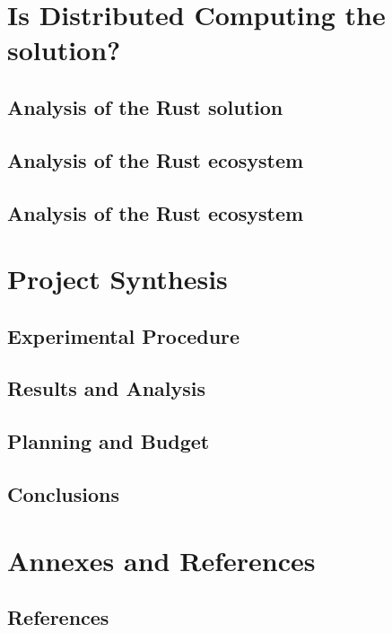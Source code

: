 \documentclass{legrand}
\begin{document}
\part{Is Distributed Computing the solution?}

\chapter{Analysis of the Rust solution}
\label{chapter:analysis}


\chapter{Analysis of the Rust ecosystem}
\label{chapter:wd2duckdb}


\chapter{Analysis of the Rust ecosystem}
\label{chapter:pschema}


\part{Project Synthesis}

\chapter{Experimental Procedure}
\label{chapter:experiment}


\chapter{Results and Analysis}
\label{chapter:results}


\chapter{Planning and Budget}
\label{chapter:planning}


\chapter{Conclusions}
\label{chapter:conclusions}


\part{Annexes and References}

\chapter{References} %
\printbibliography[heading=bibempty]
\end{document}
